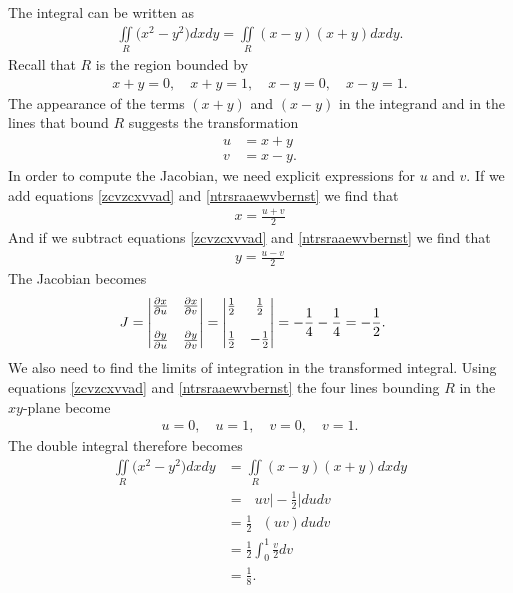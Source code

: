 \item %
The integral can be written as
\begin{align*}
  \iint\limits_R \big(x^2 - y^2\big) dxdy =  \iint\limits_R (x - y)(x+y) dxdy.
\end{align*}
Recall that $R$ is the region bounded by
\begin{align*}
  x+y = 0, \quad x+y = 1, \quad x-y=0, \quad x-y=1.
\end{align*}
The appearance of the terms $(x+y)$ and $(x - y)$ in the integrand and in the lines that bound $R$ suggests the transformation 
\begin{align}
  u & = x+y  \label{zcvzcxvvad}\\
  v &= x - y \label{ntrsraaewvbernst}.
\end{align}
In order to compute the Jacobian, we need explicit expressions for $u$ and $v$. If we add  equations \ref{zcvzcxvvad} and \ref{ntrsraaewvbernst} we find that 
\begin{align*}   x = \frac{u+v}{2}   \end{align*}
And if we subtract equations \ref{zcvzcxvvad} and \ref{ntrsraaewvbernst} we find that
\begin{align*}   y = \frac{u-v}{2}   \end{align*}
The Jacobian becomes
\begin{align*}   J &=  
  \begin{vmatrix}
   \frac{\partial x}{\partial u} &  \frac{\partial x}{\partial v} \\ \\
   \frac{\partial y}{\partial u} & \frac{\partial y}{\partial v} \\
  \end{vmatrix}
  =     \begin{vmatrix}
 \frac{1}{2} &  \frac{1}{2} \\ \\
   \frac{1}{2} & -\frac{1}{2} \\
  \end{vmatrix}
  = - \frac{1}{4}- \frac{1}{4} = - \frac{1}{2}.
 \end{align*}
We also need to find the limits of  integration in the transformed integral. Using equations \ref{zcvzcxvvad} and \ref{ntrsraaewvbernst} the four lines bounding $R$ in the $xy$-plane become 
\begin{align*}
  u = 0, \quad u = 1, \quad v=0, \quad v=1.
\end{align*}
The double integral therefore becomes
\begin{align*}
  \iint\limits_R \big(x^2 - y^2\big) dxdy 
  &=  \iint\limits_R (x - y)(x+y) dxdy \\
  &=    \mathop{\int_0^1 \! \int_0^1} uv \Bigg|-\frac{1}{2} \Bigg| dudv \\
  &=     \frac{1}{2}\mathop{\int_0^1 \! \int_0^1} (uv) dudv \\
  &=     \frac{1}{2}\int_0^1 \frac{v}{2} dv \\
  &=   \frac{1}{8}.
\end{align*}
